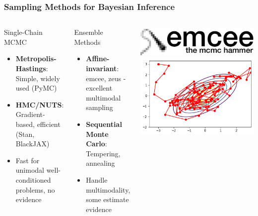 \documentclass[aspectratio=169]{beamer}
\begin{document}
\begin{frame}
    \frametitle{Sampling Methods for Bayesian Inference}
    \begin{columns}
        \begin{block}{Single-Chain MCMC}
            \begin{itemize}
                \item \textbf{Metropolis-Hastings}: Simple, widely used (PyMC)
                \item \textbf{HMC/NUTS}: Gradient-based, efficient (Stan, BlackJAX)
                \item Fast for unimodal well-conditioned problems, no evidence
            \end{itemize}
        \end{block}
        \begin{block}{Ensemble Methods}
            \begin{itemize}
                \item \textbf{Affine-invariant}: emcee, zeus - excellent multimodal sampling
                \item \textbf{Sequential Monte Carlo}: Tempering, annealing
                \item Handle multimodality, some estimate evidence
            \end{itemize}
        \end{block}
        \begin{columns}
        \includegraphics[width=\textwidth]{figures/emcee}
        \includegraphics[width=\textwidth]{figures/metropolis-hastings}

\end{columns}
\end{columns}
\end{frame}
\end{document}
